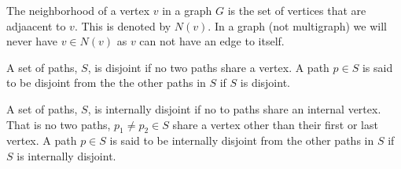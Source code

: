 \documentclass{article}
\begin{document}
\begin{definition}[neighborhood]
	The neighborhood of a vertex $v$ in a graph $G$ is the set of vertices that are adjaacent to $v$. This is denoted by $N(v)$. In a graph (not multigraph) we will never have $v \in N(v)$ as $v$ can not have an edge to itself.
\end{definition}

\begin{definition}
	A set of paths, $S$, is disjoint if no two paths share a vertex. A path $p\in S$ is said to be disjoint from the the other paths in $S$ if $S$ is disjoint.
\end{definition}

\begin{definition}
	A set of paths, $S$, is internally disjoint if no to paths share an internal vertex. That is no two paths, $p_1\not=p_2\in S$ share a vertex other than their first or last vertex. A path $p\in S$ is said to be internally disjoint from the other paths in $S$ if $S$ is internally disjoint.
\end{definition}
\end{document}
